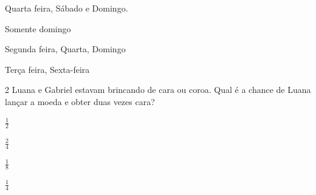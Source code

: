 \begin{escolha}
\item Quarta feira, Sábado e Domingo.
\item Somente domingo
\item Segunda feira, Quarta, Domingo
\item Terça feira, Sexta-feira
\end{escolha}




\num{2} Luana e Gabriel estavam brincando de cara ou coroa. Qual é a chance
de Luana lançar a moeda e obter duas vezes cara?

\begin{escolha}
\item $\frac{1}{2}$
\item $\frac{2}{4}$
\item $ \frac{1}{8}$
\item $\frac{1}{4}$
\end{escolha}




